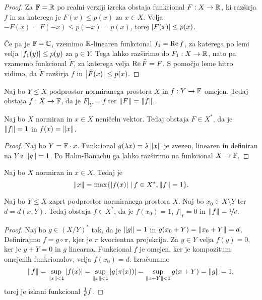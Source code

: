 \begin{proof}
  Za $\mathbb{F} = \mathbb{R}$ po realni verziji izreka obstaja funkcional $F: X \to \mathbb{R}$, ki
  razširja $f$ in za katerega je $F(x) \le p(x)$ za $x \in X$.
  Velja $-F(x) = F(-x) \le p(-x) = p(x)$, torej $\left| F(x) \right| \le p(x)$.

  Če pa je $\mathbb{F} = \mathbb{C}$, vzemimo $\mathbb{R}$-linearen funkcional $f_1 = \operatorname{Re} f$, za
  katerega po lemi velja $\left| f_1(y) \right| \le p(y)$ za $y \in Y$.
  Tega lahko razširimo do $F_1: X \to \mathbb{R}$, nato pa vzamemo funkcional
  $\tilde{F}$, za katerega velja $\operatorname{Re} \tilde{F} = F$.
  S pomočjo leme hitro vidimo, da $\tilde{F}$ razširja $f$ in
  $\left| \tilde{F}(x) \right| \le p(x)$.
\end{proof}

\begin{izrek}
  Naj bo $Y \le X$ podprostor normiranega prostora $X$ in $f: Y \to \mathbb{F}$ omejen.
  Tedaj obstaja $f: X \to \mathbb{F}$, da je $\left. F \right|_Y = f$ ter $\left\lVert F\right\rVert =
  \left\lVert f\right\rVert$.
\end{izrek}

\begin{posledica}
  Naj bo $X$ normiran in $x \in X$ neničeln vektor.
  Tedaj obstaja $F \in X^*$, da je $\left\lVert f\right\rVert = 1$ in $f(x) = \left\lVert x\right\rVert$.
\end{posledica}

\begin{proof}
  Naj bo $Y = \mathbb{F} \cdot x$.
  Funkcional $g(\lambda x) = \lambda \left\lVert x\right\rVert$ je zvezen, linearen in definiran
  na $Y$ z $\left\lVert g\right\rVert = 1$.
  Po Hahn-Banachu ga lahko razširimo na funkcional $X \to \mathbb{F}$.
\end{proof}

\begin{posledica}
  Naj bo $X$ normiran in $x \in X$.
  Tedaj je
  \[
	\left\lVert x\right\rVert = \max \{\left| f(x) \right| \,|\, f \in X^*, \left\lVert f\right\rVert = 1\}.
  \]
\end{posledica}

\begin{posledica}
  Naj bo $Y \le X$ zaprt podprostor normiranega prostora $X$.
  Naj bo $x_0 \in X \setminus Y$ ter $d = d(x,Y)$.
  Tedaj obstaja $f \in X^*$, da je $f(x_0) = 1$, $\left. f \right|_Y = 0$ in
  $\left\lVert f\right\rVert = \nicefrac{1}{d}$.
\end{posledica}

\begin{proof}
  Naj bo $g \in (X/Y)^*$ tak, da je $\left\lVert g\right\rVert = 1$ in $g(x_0 + Y) = \left\lVert x_0 +
	Y\right\rVert = d$.
  Definirajmo $f = g \circ \pi$, kjer je $\pi$ kvocientna projekcija.
  Za $y \in Y$ velja $f(y) = 0$, ker je $y + Y = 0$ in $g$ linearna.
  Funkcional $f$ je omejen, ker je kompozitum omejenih funkcionalov, velja
  $f(x_0) = d$.
  Izračunamo
  \[
	\left\lVert f\right\rVert = \sup_{\left\lVert x\right\rVert < 1} \left| f(x) \right|
	= \sup_{\left\lVert x\right\rVert < 1} \left| g(\pi(x)) \right|
	= \sup_{\left\lVert x + Y\right\rVert < 1} g(x + Y)
	= \left\lVert g\right\rVert = 1,
  \]
  torej je iskani funkcional $\frac{1}{d} f$.
\end{proof}

